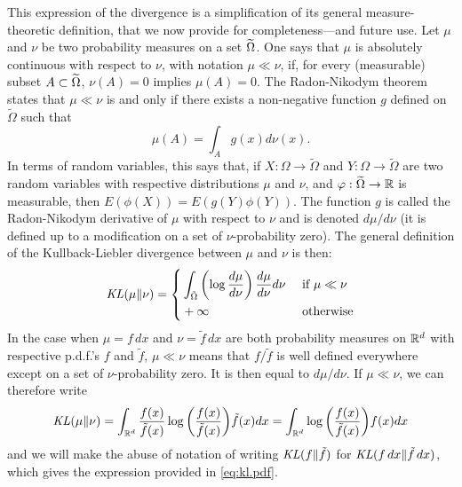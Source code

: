This expression of the divergence is a simplification of its general mea\-sure-theo\-retic definition, that we now provide for completeness---and future use. Let $\mu$ and $\nu$ be two probability measures on a set $\widetilde {\Omega}$. One says that $\mu$ is absolutely continuous with respect to $\nu$, with notation $\mu\ll\nu$, if, for every (measurable) subset  $A \subset \widetilde \Omega$, $\nu(A) = 0$ implies $\mu(A) = 0$. The Radon-Nikodym theorem \citep{billingsley2008probability} states that $\mu\ll \nu$ is and only if there exists a non-negative function $g$ defined on $\widetilde \Omega$ such that 
\[
\mu(A) = \int_{A} g(x) d\nu(x).
\]
In terms of random variables, this says that, if $X: \Omega \to \widetilde \Omega$ and $Y: \Omega \to \widetilde \Omega$ are two random variables with respective distributions $\mu$ and $\nu$, and $\varphi: \widetilde \Omega \to {\mathbb{R}}$ is measurable, then $E(\phi(X)) = E(g(Y)\phi(Y))$. The function $g$ is called the Radon-Nikodym derivative of $\mu$ with respect to $\nu$ and is denoted $d\mu/d\nu$ (it is defined up to a modification on a set of $\nu$-probability zero). The general definition of the Kullback-Liebler divergence between $\mu$ and $\nu$ is then:
\begin{equation}
\label{eq:kl.definition}
\mathit{KL}(\mu \| \nu) = \left\{
\begin{aligned}
&\int_{\tilde{\Omega}} \left(\log \frac{d\mu}{d\nu}\right)  \frac{d\mu}{d\nu} d\nu && \text{ if } \mu \ll \nu\\
&+\infty && \text{ otherwise}
\end{aligned}
\right.
\end{equation}
In the case when $\mu = f \,dx$ and $\nu = \tilde f \,dx$ are both probability measures on ${\mathbb{R}}^d$ with respective p.d.f.'s $f$ and $\tilde f$, $\mu \ll \nu$ means that $f/\tilde f$ is well defined everywhere except on a set of $\nu$-probability zero. It is then equal to $d\mu/d\nu$.  If $\mu\ll\nu$, we can therefore write
\[
\mathit{KL}(\mu\|\nu) = \int_{{\mathbb{R}}^d} \frac{f(x)}{\tilde f(x)} \log \bigg(\frac{f(x)}{{\tilde{f}}(x)}\bigg) \tilde f(x) dx = \int_{{\mathbb{R}}^d}  \log \bigg(\frac{f(x)}{{\tilde{f}}(x)}\bigg) f(x) dx
\] 
and
we will make the abuse of notation of writing $\mathit{KL}(f \| {\tilde{f}})$ for $\mathit{KL}(f\, dx\| {\tilde{f}}\,dx)$, which gives the expression provided in \cref{eq:kl.pdf}. 

